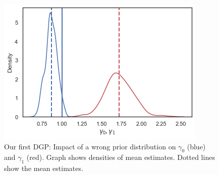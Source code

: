 \begin{figure}[h!]
  \centering
    \includegraphics[width=\linewidth]{graphics/dgp_1_wrong_prior}
    \caption{Our first DGP: Impact of a wrong prior distribution on $\gamma_0$ (blue) and $\gamma_1$ (red). Graph shows densities of mean estimates. Dotted lines show the mean estimates.}
  \label{fig:wrong_prior_dgp1}
\end{figure}

